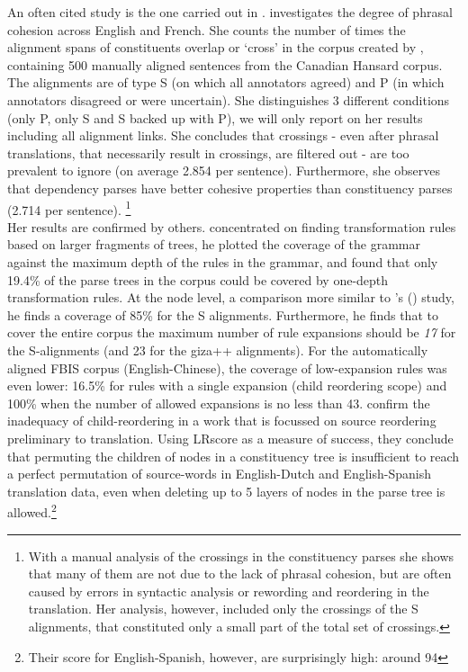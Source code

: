 \documentclass{report}
\theoremstyle{definition}
\theoremstyle{plain}
\def\citepos#1{\citeauthor{#1}'s (\citeyear{#1})}
\begin{document}
An often cited study is the one carried out in \cite{fox2002phrasal}. \citeauthor{fox2002phrasal} investigates the degree of phrasal cohesion across English and French. She counts the number of times the alignment spans of constituents overlap or `cross' in the corpus created by \cite{och2000improved}, containing 500 manually aligned sentences from the Canadian Hansard corpus. The alignments are of type S (on which all annotators agreed) and P (in which annotators disagreed or were uncertain). She distinguishes 3 different conditions (only P, only S and S backed up with P), we will only report on her results including all alignment links. She concludes that crossings - even after phrasal translations, that necessarily result in crossings, are filtered out - are too prevalent to ignore (on average 2.854 per sentence). Furthermore, she observes that dependency parses have better cohesive properties than constituency parses (2.714 per sentence). \footnote{With a manual analysis of the crossings in the constituency parses she shows that many of them are not due to the lack of phrasal cohesion, but are often caused by errors in syntactic analysis or rewording and reordering in the translation. Her analysis, however, included only the crossings of the S alignments, that constituted only a small part of the total set of crossings.}\\
Her results are confirmed by others. \cite{galley2004s} concentrated on finding transformation rules based on larger fragments of trees, he plotted the coverage of the grammar against the maximum depth of the rules in the grammar, and found that only 19.4\% of the parse trees in the corpus could be covered by one-depth transformation rules. At the node level, a comparison more similar to \citepos{fox2002phrasal} study, he finds a coverage of 85\% for the S alignments. Furthermore, he finds that to cover the entire corpus the maximum number of rule expansions should be \textit{17} for the S-alignments (and 23 for the giza++ alignments). For the automatically aligned FBIS corpus (English-Chinese), the coverage of low-expansion rules was even lower: 16.5\% for rules with a single expansion (child reordering scope) and 100\% when the number of allowed expansions is no less than 43. \cite{khalilov2012statistical} confirm the inadequacy of child-reordering in a work that is focussed on source reordering preliminary to translation. Using LRscore \citep{birch2010lrscore} as a measure of success, they conclude that permuting the children of nodes in a constituency tree is insufficient to reach a perfect permutation of source-words in English-Dutch and English-Spanish translation data, even when deleting up to 5 layers of nodes in the parse tree is allowed.\footnote{Their score for English-Spanish, however, are surprisingly high: around 94}
\end{document}
